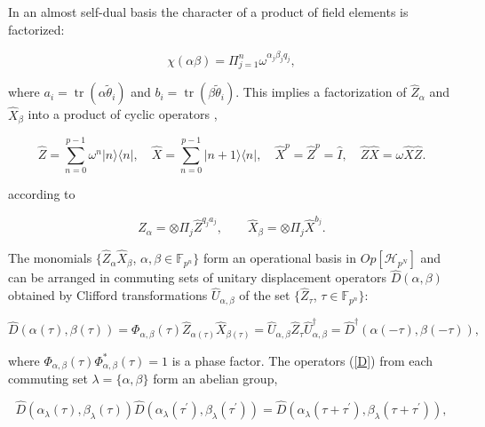 \documentclass[quantumrep,article,submit,pdftex,moreauthors]{Definitions/mdpi}
\DeclareMathOperator{\tr}{tr}
\begin{document}
In an almost self-dual basis the character of a product of field elements is
factorized:

\begin{equation}
  \chi\left( \alpha\beta \right)
  = \Pi_{j=1}^{n} \omega^{\alpha_{j}\beta_{j}q_{j}},
  \label{chi fact}
\end{equation}

where $a_{i}=\tr(\alpha\tilde{\theta}_{i})$ and $b_{i} =
\tr(\beta\tilde{\theta}_{i})$. This implies a factorization of
$\hat{Z}_{\alpha}$ and $\hat{X}_{\beta }$ into a product of cyclic operators
\cite{Schwinger1,Schwinger2},

\begin{equation}
  \hat{Z}
  = \sum_{n=0}^{p-1} \omega^{n} |n\rangle \langle n|, \quad \hat{X}
  = \sum_{n=0}^{p-1} |n+1\rangle \langle n|,
  \quad \hat{X}^{p} = \hat{Z}^{p} = \hat{I},
  \quad \hat{Z}\hat{X} = \omega \hat{X}\hat{Z}.
\end{equation}

according to

\begin{equation}
  \hat{Z}_{\alpha}
  = \otimes \Pi_{j}\hat{Z}^{q_{j}a_{j}},
  \qquad \hat{X}_{\beta}
  = \otimes \Pi_{j}\hat{X}^{b_{j}}.
  \label{ZXq}
\end{equation}

The monomials $\{\hat{Z}_{\alpha}\hat{X}_{\beta}$, $\alpha,\beta \in
\mathbb{F}_{p^{n}}\}$ form an operational basis in $Op[\mathcal{H}_{p^{N}}]$ and
can be arranged in commuting sets of unitary displacement operators
$\hat{D}(\alpha,\beta)$ obtained by Clifford transformations
$\hat{U}_{\alpha,\beta}$ of the set $\{\hat{Z}_{\tau}$, $\tau \in
\mathbb{F}_{p^{n}}\}$:

\begin{equation}
  \hat{D} \left( \alpha(\tau),\beta(\tau) \right)
  = \Phi_{\alpha,\beta} \left( \tau \right)
  \hat{Z}_{\alpha(\tau)}\hat{X}_{\beta(\tau)}
  = \hat{U}_{\alpha,\beta}\hat{Z}_{\tau}\hat{U}_{\alpha,\beta}^{\dagger}
  = \hat{D}^{\dagger}\left(\alpha(-\tau),\beta(-\tau)\right),
  \label{D}
\end{equation}

where $\Phi_{\alpha,\beta}\left( \tau \right) \Phi_{\alpha,\beta}^{\ast}\left(
\tau \right)=1$ is a phase factor. The operators (\ref{D}) from each commuting
set $\lambda=\{\alpha,\beta\}$ form an abelian group,

\begin{equation}
  \hat{D}\left( \alpha_{\lambda}(\tau),\beta_{\lambda }(\tau) \right)
  \hat{D}\left(
    \alpha_{\lambda}(\tau^{\prime}),\beta_{\lambda}(\tau^{\prime})
  \right)
  = \hat{D}\left(
    \alpha_{\lambda}(\tau + \tau^{\prime}),
    \beta_{\lambda}(\tau + \tau^{\prime})
  \right),
  \label{DD}
\end{equation}
\end{document}
